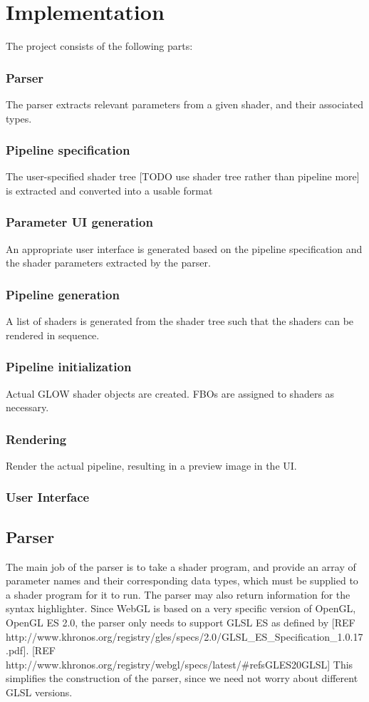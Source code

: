 \documentclass[12pt,twoside,notitlepage]{report}
\begin{document}
\cleardoublepage
\chapter{Implementation}
The project consists of the following parts:
\subsection{Parser}
The parser extracts relevant parameters from a given shader, and their associated types.
\subsection{Pipeline specification}
The user-specified shader tree [TODO use shader tree rather than pipeline more] is extracted and converted into a usable format
\subsection{Parameter UI generation}
An appropriate user interface is generated based on the pipeline specification and the shader parameters extracted by the parser.
\subsection{Pipeline generation}
A list of shaders is generated from the shader tree such that the shaders can be rendered in sequence.
\subsection{Pipeline initialization}
Actual GLOW shader objects are created. FBOs are assigned to shaders as necessary.
\subsection{Rendering}
Render the actual pipeline, resulting in a preview image in the UI.
\subsection{User Interface}

\section{Parser}
The main job of the parser is to take a shader program, and provide an array of parameter names and their corresponding data types, which must be supplied to a shader program for it to run. The parser may also return information for the syntax highlighter. Since WebGL is based on a very specific version of OpenGL, OpenGL ES 2.0, the parser only needs to support GLSL ES as defined by [REF http://www.khronos.org/registry/gles/specs/2.0/GLSL_ES_Specification_1.0.17.pdf]. [REF http://www.khronos.org/registry/webgl/specs/latest/#refsGLES20GLSL] This simplifies the construction of the parser, since we need not worry about different GLSL versions.
\end{document}
